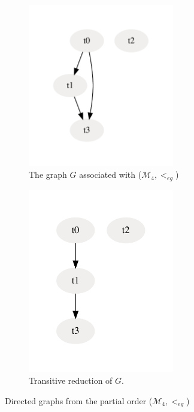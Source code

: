 \documentclass[acmsmall,screen, review]{acmart}
\begin{document}
\begin{figure}[h!]
	\centering
	\begin{subfigure}{0.45\textwidth}
		\centering
		\includegraphics[width=0.7\textwidth]{fig/ch3/met-dfg}
		\caption{The graph $G$ associated with ($\mathcal{M}_4, <_{eg}$) }
		\label{fig3:met-dfg}
	\end{subfigure}
	\hfill
	\begin{subfigure}{0.42\textwidth}
		\centering
		\includegraphics[width=0.7\textwidth]{fig/ch3/met-dfg-tr}
		\caption{Transitive reduction of $G$.}
		\label{fig3:met-dfg-tr}
	\end{subfigure}
	\caption{Directed graphs from the partial order ($\mathcal{M}_4, <_{eg}$)}
	\label{fig3:met-eg-g}
\end{figure}
\end{document}
